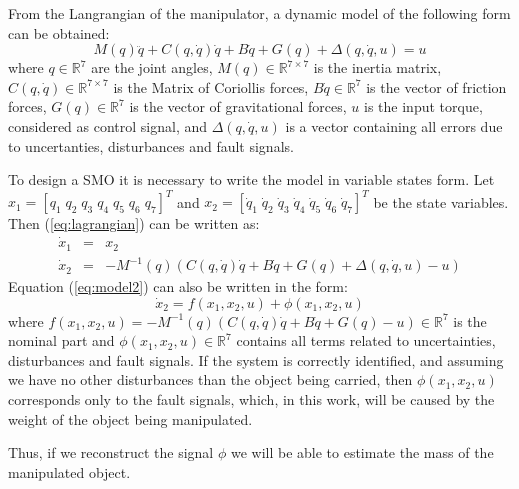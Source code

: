 \documentclass[smallextended]{svjour3}       %
\begin{document}
  From the Langrangian of the manipulator, a dynamic model of the following form can be obtained:
  \begin{equation}
    M(q)\ddot{q} + C(q, \dot{q})\dot{q} + B\dot{q} + G(q) + \Delta(q,\dot{q}, u) = u
    \label{eq:lagrangian}
  \end{equation}
  where $q\in \mathbb{R}^7$ are the joint angles, $M(q)\in \mathbb{R}^{7\times 7}$ is the inertia matrix, $C(q,\dot{q})\in \mathbb{R}^{7\times 7}$ is the Matrix of Coriollis forces, $B\dot{q}\in \mathbb{R}^7$ is the vector of friction forces, $G(q)\in\mathbb{R}^7$ is the vector of gravitational forces, $u$ is the input torque, considered as control signal, and $\Delta(q,\dot{q},u)$ is a vector containing all errors due to uncertanties, disturbances and fault signals.
  
  To design a SMO it is necessary to write the model in variable states form. Let $x_1 = [q_1\;q_2\;q_3\;q_4\;q_5\;q_6\;q_7]^T$ and $x_2 = [\dot{q}_1\;\dot{q}_2\;\dot{q}_3\;\dot{q}_4\;\dot{q}_5\;\dot{q}_6\;\dot{q}_7]^T$ be the state variables. Then (\ref{eq:lagrangian}) can be written as:
  \begin{eqnarray}
    \dot{x}_1 &=& x_2\label{eq:model1}\\
    \dot{x}_2 &=& -M^{-1}(q)\left(C(q, \dot{q})\dot{q} + B\dot{q} + G(q) + \Delta(q,\dot{q},u) - u\right)\label{eq:model2}
  \end{eqnarray}
Equation (\ref{eq:model2}) can also be written in the form:
  \begin{equation*}
    \dot{x}_2 = f(x_1, x_2, u) + \phi(x_1, x_2, u)
  \end{equation*}
  where $f(x_1, x_2, u) = -M^{-1}(q)\left(C(q, \dot{q})\dot{q} + B\dot{q} + G(q) - u\right) \in \mathbb{R}^7$ is the nominal part and $\phi(x_1, x_2, u) \in \mathbb{R}^7$ contains all terms related to uncertainties, disturbances and fault signals. If the system is correctly identified, and assuming we have no other disturbances than the object being carried, then $\phi(x_1, x_2, u)$ corresponds only to the fault signals, which, in this work, will be caused by the weight of the object being manipulated.

  Thus, if we reconstruct the signal $\phi$ we will be able to estimate the mass of the manipulated object. 
\end{document}
